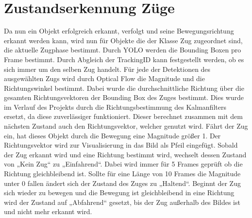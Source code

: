 \documentclass[conference]{IEEEtran}
\begin{document}
	\section{Zustandserkennung Züge}
	Da nun ein Objekt erfolgreich erkannt, verfolgt und seine Bewegungsrichtung erkannt werden kann, wird nun für Objekte die der Klasse Zug zugeordnet sind, die aktuelle Zugphase bestimmt.  
	Durch YOLO werden die Bounding Boxen pro Frame bestimmt. Durch Abgleich der TrackingID kann festgestellt werden, ob es sich immer um den selben Zug handelt. Für jede der Detektionen des ausgewählten Zugs wird durch Optical Flow die Magnitude und die Richtungswinkel bestimmt. Dabei wurde die durchschnittliche Richtung über die gesamten Richtungsvektoren der Bounding Box des Zuges bestimmt. Dies wurde im Verlauf des Projekts durch die Richtungsbestimmung des Kalmanfilters ersetzt, da diese zuverlässiger funktioniert. Dieser berechnet zusammen mit dem nächsten Zustand auch den Richtungsvektor, welcher genutzt wird. Fährt der Zug ein, hat dieses Objekt durch die Bewegung eine Magnitude größer 1. Der Richtungsvektor wird zur Visualisierung in das Bild als Pfeil eingefügt. Sobald der Zug erkannt wird und eine Richtung bestimmt wird, wechselt dessen Zustand von „Kein Zug“ zu „Einfahrend“. Dabei wird immer für 5 Frames geprüft ob die Richtung gleichbleibend ist. Sollte für eine Länge von 10 Frames die Magnitude unter 0 fallen ändert sich der Zustand des Zuges zu „Haltend“. Beginnt der Zug sich wieder zu bewegen und die Bewegung ist gleichbleibend in eine Richtung wird der Zustand auf „Abfahrend“ gesetzt, bis der Zug außerhalb des Bildes ist und nicht mehr erkannt wird.
	
	
\end{document}

